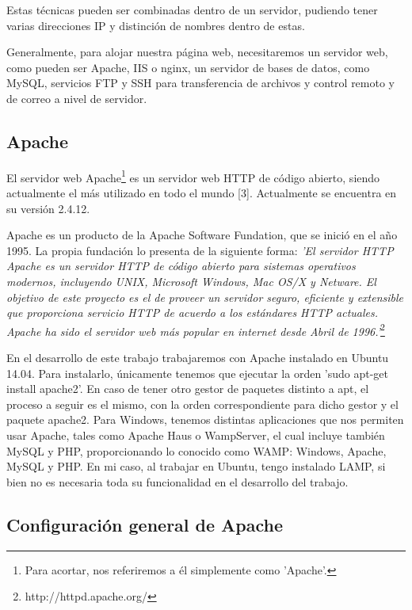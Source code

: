 \documentclass[a4paper, 10pt]{article} %
\begin{document}
Estas técnicas pueden ser combinadas dentro de un servidor, pudiendo tener varias direcciones IP y distinción de nombres dentro de estas.  

Generalmente, para alojar nuestra página web, necesitaremos un servidor web, como pueden ser Apache, IIS o nginx, un servidor de bases de datos, como MySQL, servicios FTP y SSH para transferencia de archivos y control remoto y de correo a nivel de servidor. 

\subsection{Apache}

El servidor web Apache\footnote{Para acortar, nos referiremos a él simplemente como 'Apache'.} es un servidor web HTTP de código abierto, siendo actualmente el más utilizado en todo el mundo [3]. Actualmente se encuentra en su versión 2.4.12. 

Apache es un producto de la Apache Software Fundation, que se inició en el año 1995. La propia fundación lo presenta de la siguiente forma: \textit{'El servidor HTTP Apache es un servidor HTTP de código abierto para sistemas operativos modernos, incluyendo UNIX, Microsoft Windows, Mac OS/X y Netware. El objetivo de este proyecto es el de proveer un servidor seguro, eficiente y extensible que proporciona servicio HTTP de acuerdo a los estándares HTTP actuales. Apache ha sido el servidor web más popular en internet desde Abril de 1996.'}\footnote{http://httpd.apache.org/}

En el desarrollo de este trabajo trabajaremos con Apache instalado en Ubuntu 14.04. Para instalarlo, únicamente tenemos que ejecutar la orden 'sudo apt-get install apache2'. En caso de tener otro gestor de paquetes distinto a apt, el proceso a seguir es el mismo, con la orden correspondiente para dicho gestor y el paquete apache2. Para Windows, tenemos distintas aplicaciones que nos permiten usar Apache, tales como Apache Haus o WampServer, el cual incluye también MySQL y PHP, proporcionando lo conocido como WAMP: Windows, Apache, MySQL y PHP. En mi caso, al trabajar en Ubuntu, tengo instalado LAMP, si bien no es necesaria toda su funcionalidad en el desarrollo del trabajo. 


\subsection{Configuración general de Apache}

\end{document}

